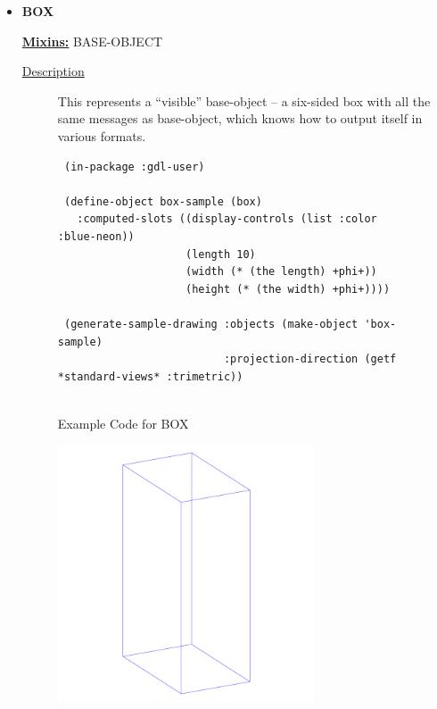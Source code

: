 \documentclass [11pt]{book}
\begin{document}
\begin{itemize}
\item {}
\label{prim:box}
\textbf{BOX}


\textbf{
\underline{Mixins:}} BASE-OBJECT





\begin{description}

\item [
\underline{Description}]


This represents a ``visible'' base-object -- a six-sided box with all the same
messages as base-object, which knows how to output itself in various formats.



\end{description}




\begin{figure}
\begin{lrbox}{\boxedverb}
\begin{minipage}{\linewidth}
{\small

\begin{verbatim}
 (in-package :gdl-user)

 (define-object box-sample (box)
   :computed-slots ((display-controls (list :color :blue-neon))
                    (length 10)
                    (width (* (the length) +phi+))
                    (height (* (the width) +phi+))))

 (generate-sample-drawing :objects (make-object 'box-sample)
                          :projection-direction (getf *standard-views* :trimetric))


\end{verbatim}}
\end{minipage}
\end{lrbox}
\fbox{\usebox{\boxedverb}}

\caption{Example Code for BOX}

\label{fig:example-code-BOX}

\end{figure}

\begin{figure}
\begin{center}
\includegraphics[width=3in,height=3in]{../images/example-box.pdf}
\end{center}


\end{figure}
\end{itemize}
\end{document}
